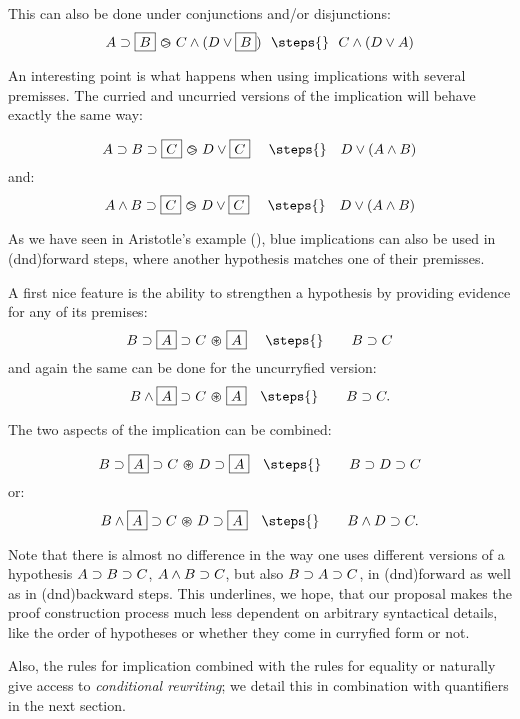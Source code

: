 This can also be done under conjunctions and/or disjunctions:
$$
  A\limp \select{B} \back C \land (D\lor \select{B}) ~~ \steps{} ~~ C \land (D\lor A)
$$

An interesting point is what happens when using implications with
several premisses. The curried and uncurried versions of the
implication will behave exactly the same way:

$$
  A\limp B \limp \select{C} \back D\lor \select{C}
  ~~~\/ ~\steps{}~~~  D\lor (A\land B)
$$
and:
$$
  A\land B \limp \select{C} \back D\lor \select{C}
  ~~~ \/ ~\steps{}~~~  D\lor (A\land B)
$$


As we have seen in Aristotle's example (), blue
implications can also be used in \kl(dnd){forward} steps, where another
hypothesis matches one of their premisses.

A first nice feature is the ability to strengthen a hypothesis by
providing evidence for any of its premises:
$$
B\limp \select{A}\limp C \forw \select {A}  ~~\/~\/~\steps{}~\/~~~~~
B\limp C$$
and again the same can be done for the uncurryfied version:
$$
B\land \select{A}\limp C \forw \select {A}  ~\/~\/~\steps{}~\/~~~~~
B\limp C.$$

The two aspects of the implication can be combined:

$$
B\limp \select{A}\limp C \forw D\limp\select {A}  ~\/~\/~\steps{}~\/~~~~~
B\limp D\limp C$$
or:
$$
B\land \select{A}\limp C \forw D\limp\select {A}  ~\/~\/~\steps{}~\/~~~~~
B\land D \limp C.$$


Note that there is almost no difference in the way one uses different
versions of a hypothesis $A\supset B\supset C$, $A\land B\supset
C$, but also $B\supset A\supset C$, in \kl(dnd){forward} as well as in
\kl(dnd){backward} steps. This underlines, we hope, that our
proposal makes the proof construction process much less dependent on
arbitrary syntactical details, like the order of hypotheses or whether
they come in curryfied form or not.

Also, the rules for implication combined with the rules for equality
 or  naturally give access to {\em
  conditional rewriting}; we detail this in combination with
quantifiers in the next section.

